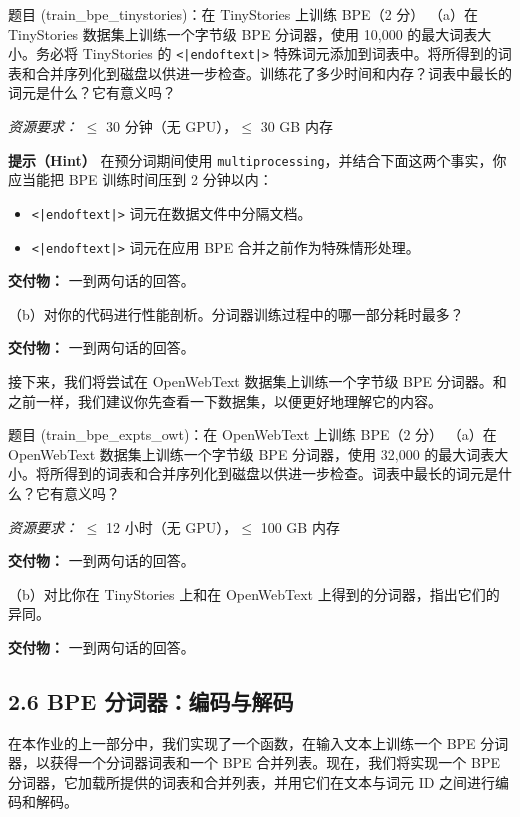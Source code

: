 \begin{problembox}{题目 (train\_bpe\_tinystories)：在 TinyStories 上训练 BPE（2 分）}
（a）在 TinyStories 数据集上训练一个字节级 BPE 分词器，使用 10{,}000 的最大词表大小。务必将 TinyStories 的 \texttt{<|endoftext|>} 特殊词元添加到词表中。将所得到的词表和合并序列化到磁盘以供进一步检查。训练花了多少时间和内存？词表中最长的词元是什么？它有意义吗？

\textit{资源要求：} $\leq$ 30 分钟（无 GPU），$\leq$ 30 GB 内存

\medskip
\textbf{提示（Hint）} 在预分词期间使用 \texttt{multiprocessing}，并结合下面这两个事实，你应当能把 BPE 训练时间压到 2 分钟以内：
\begin{itemize}[leftmargin=2em]
\item[(a)] \texttt{<|endoftext|>} 词元在数据文件中分隔文档。
\item[(b)] \texttt{<|endoftext|>} 词元在应用 BPE 合并之前作为特殊情形处理。
\end{itemize}
\textbf{交付物：} 一到两句话的回答。

\medskip
（b）对你的代码进行性能剖析。分词器训练过程中的哪一部分耗时最多？

\textbf{交付物：} 一到两句话的回答。
\end{problembox}

接下来，我们将尝试在 OpenWebText 数据集上训练一个字节级 BPE 分词器。和之前一样，我们建议你先查看一下数据集，以便更好地理解它的内容。

\begin{problembox}{题目 (train\_bpe\_expts\_owt)：在 OpenWebText 上训练 BPE（2 分）}
（a）在 OpenWebText 数据集上训练一个字节级 BPE 分词器，使用 32{,}000 的最大词表大小。将所得到的词表和合并序列化到磁盘以供进一步检查。词表中最长的词元是什么？它有意义吗？

\textit{资源要求：} $\leq$ 12 小时（无 GPU），$\leq$ 100 GB 内存

\textbf{交付物：} 一到两句话的回答。

\medskip
（b）对比你在 TinyStories 上和在 OpenWebText 上得到的分词器，指出它们的异同。

\textbf{交付物：} 一到两句话的回答。
\end{problembox}

\subsection*{2.6 BPE 分词器：编码与解码}

在本作业的上一部分中，我们实现了一个函数，在输入文本上训练一个 BPE 分词器，以获得一个分词器词表和一个 BPE 合并列表。现在，我们将实现一个 BPE 分词器，它加载所提供的词表和合并列表，并用它们在文本与词元 ID 之间进行编码和解码。

